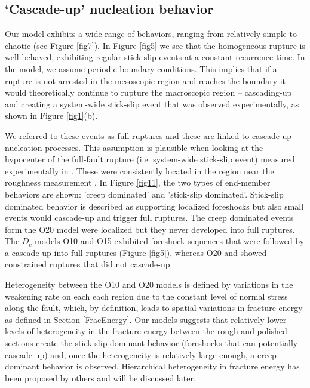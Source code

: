 \documentclass[preprint,1p, 10pt,authoryear]{elsarticle}
\begin{document}
\subsection{`Cascade-up' nucleation behavior}
\label{Cascade_UP}
Our model exhibits a wide range of behaviors, ranging from relatively simple to chaotic (see Figure \ref{fig7}). In Figure \ref{fig5} we see that the homogeneous rupture is well-behaved, exhibiting regular stick-slip events at a constant recurrence time.  In the model, we assume periodic boundary conditions. This implies that if a rupture is not arrested in the mesoscopic region and reaches the boundary it would theoretically continue to rupture the macroscopic region -- cascading-up and creating a system-wide stick-slip event that was observed experimentally, as shown in Figure \ref{fig1}(b). 

We referred to these events as full-ruptures and these are linked to cascade-up nucleation processes. This assumption is plausible when looking at the hypocenter of the full-fault rupture (i.e. system-wide stick-slip event) measured experimentally in \citet{Selvadurai2015}. These were consistently located in the region near the roughness measurement \citep[magenta star in Fig. 7 and 8 in ][]{Selvadurai2015}. In Figure \ref{fig11}, the two types of end-member behaviors are shown: 'creep dominated' and 'stick-slip dominated'. Stick-slip dominated behavior is described as supporting localized foreshocks but also small events would cascade-up and trigger full ruptures. The creep dominated events form the O20 model were localized but they never developed into full ruptures. The $D_{c}$-models O10 and O15 exhibited foreshock sequences that were followed by a cascade-up into full ruptures (Figure \ref{fig5}), whereas O20 and showed constrained ruptures that did not cascade-up. 

Heterogeneity between the O10 and O20 models is defined by variations in the weakening rate on each each region due to the constant level of normal stress along the fault, which, by definition, leads to spatial variations in fracture energy as defined in Section \ref{FracEnergy}. Our models suggests that relatively lower levels of heterogeneity in the fracture energy between the rough and polished sections create the stick-slip dominant behavior (foreshocks that can potentially cascade-up) and, once the heterogeneity is relatively large enough, a creep-dominant behavior is observed. Hierarchical heterogeneity in fracture energy has been proposed by others \citep{Ide2005, Aochi2014, Aochi2017} and will be discussed later.
\end{document}
